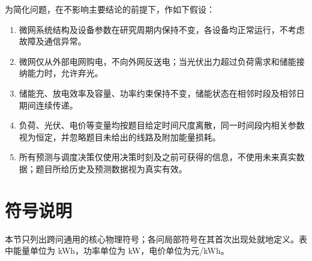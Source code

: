 \documentclass[withoutpreface,bwprint]{cumcmthesis}
\begin{document}
为简化问题，在不影响主要结论的前提下，作如下假设：

\begin{enumerate}[itemindent=2em]
\item 微网系统结构及设备参数在研究周期内保持不变，各设备均正常运行，不考虑故障及通信异常。
\item 微网仅从外部电网购电，不向外网反送电；当光伏出力超过负荷需求和储能接纳能力时，允许弃光。
\item 储能充、放电效率及容量、功率约束保持不变，储能状态在相邻时段及相邻日期间连续传递。
\item 负荷、光伏、电价等变量均按题目给定时间尺度离散，同一时间段内相关参数视为恒定，并忽略题目未给出的线路及附加能量损耗。
\item 所有预测与调度决策仅使用决策时刻及之前可获得的信息，不使用未来真实数据；题目所给历史及预测数据视为真实有效。
\end{enumerate}


\section{符号说明}

本节只列出跨问通用的核心物理符号；各问局部符号在其首次出现处就地定义。表中能量单位为 kWh，功率单位为 kW，电价单位为元/kWh。
\end{document}
